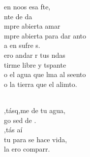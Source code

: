 \begin{cancion}
	 en noos esa fte,\\
	nte de da\\
	mpre abierta  amar\\
	mpre abierta para dar anto\\
	a en sufre s. \\
	ero andar r tus ndas\\
	tirme libre y tspante\\
	o el agua que lma al seento\\
	o la tierra que el alimto.\\\jump\\
	\begin{chorus}%
	,tásq,me de tu agua, \\
	go sed de .\\
	,tás aí\\
	tu para se hace vida,\\
	la ero comparr.\\
	\end{chorus}%
	\jump\\
\end{cancion}%
